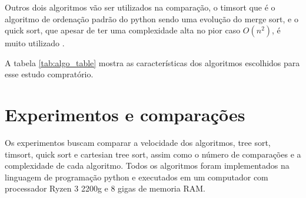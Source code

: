 \documentclass[12pt]{article}
\begin{document}
Outros dois algoritmos vão ser utilizados na comparação, o timsort que é o algoritmo de ordenação padrão do python sendo uma evolução do merge sort, e o quick sort, que apesar de ter uma complexidade alta no pior caso $O(n^2)$, é muito utilizado \cite{astrachan2003bubble}.

A tabela \ref{tab:algo_table} mostra as características dos algoritmos escolhidos para esse estudo compratório.

\begin{table}[H]
    \centering
    \caption{características dos algoritmos}
    \label{tab:algo_table}
\end{table}

\section{Experimentos e comparações}
\label{sec:experimentos}

Os experimentos buscam comparar a velocidade dos algoritmos, tree sort, timsort, quick sort e cartesian tree sort, assim como o número de comparações e a complexidade de cada algoritmo. Todos os algoritmos foram implementados na linguagem de programação python e executados em um computador com processador Ryzen 3 2200g e 8 gigas de memoria RAM. 
\end{document}
